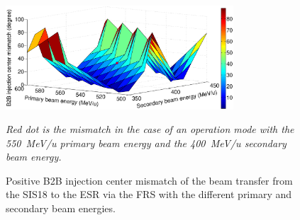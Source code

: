 \begin{figure}[!htb]
   \centering   
   \includegraphics*[width=85mm]{18ESR.eps}
   \caption{Positive B2B injection center mismatch of the beam transfer from the SIS18 to the ESR via the FRS with the different primary and secondary beam energies.}{\textsl{\small{Red dot is the mismatch in the case of an operation mode with the \SI{550}{MeV/u} primary beam energy and the \SI{400}{MeV/u} secondary beam energy.}}}
   \label{1st_2nd_3}
\end{figure} 


